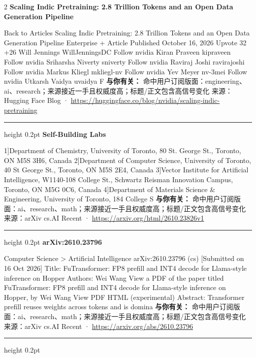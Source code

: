 \documentclass[10.5pt]{ctexart}
\begin{document}
\begin{multicols}{2}
{\large\bfseries Scaling Indic Pretraining: 2.8 Trillion Tokens and an Open Data Generation Pipeline}\par
Back to Articles Scaling Indic Pretraining: 2.8 Trillion Tokens and an Open Data Generation Pipeline Enterprise + Article Published October 16, 2026 Upvote 32 +26 Will Jennings WillJenningsDC Follow nvidia Kiran Praveen kipraveen Follow nvidia Sriharsha Niverty sniverty Follow nvidia Raviraj Joshi ravirajoshi Follow nvidia Markus Kliegl mkliegl-nv Follow nvidia Yev Meyer nv-3mei Follow nvidia Utkarsh Vaidya uvaidya F
\textbf{与你有关：} 命中用户订阅版面：engineering、ai、research；来源接近一手且权威度高；标题/正文包含高信号变化
{\footnotesize\color{ormuted} 来源：Hugging Face Blog · \url{https://huggingface.co/blog/nvidia/scaling-indic-pretraining}}
\vspace{2mm}
\hrule height 0.2pt
\vspace{2mm}
{\large\bfseries Self-Building Labs}\par
1]Department of Chemistry, University of Toronto, 80 St. George St., Toronto, ON M5S 3H6, Canada 2]Department of Computer Science, University of Toronto, 40 St George St., Toronto, ON M5S 2E4, Canada 3]Vector Institute for Artificial Intelligence, W1140-108 College St., Schwartz Reisman Innovation Campus, Toronto, ON M5G 0C6, Canada 4]Department of Materials Science \& Engineering, University of Toronto, 184 College S
\textbf{与你有关：} 命中用户订阅版面：ai、research、math；来源接近一手且权威度高；标题/正文包含高信号变化
{\footnotesize\color{ormuted} 来源：arXiv cs.AI Recent · \url{https://arxiv.org/html/2610.23826v1}}
\vspace{2mm}
\hrule height 0.2pt
\vspace{2mm}
{\large\bfseries arXiv:2610.23796}\par
Computer Science > Artificial Intelligence arXiv:2610.23796 (cs) [Submitted on 16 Oct 2026] Title: FuTransformer: FP8 prefill and INT4 decode for Llama-style inference on Hopper Authors: Wei Wang View a PDF of the paper titled FuTransformer: FP8 prefill and INT4 decode for Llama-style inference on Hopper, by Wei Wang View PDF HTML (experimental) Abstract: Transformer prefill reuses weights across tokens and is domina
\textbf{与你有关：} 命中用户订阅版面：ai、research、math；来源接近一手且权威度高；标题/正文包含高信号变化
{\footnotesize\color{ormuted} 来源：arXiv cs.AI Recent · \url{https://arxiv.org/abs/2610.23796}}
\vspace{2mm}
\hrule height 0.2pt

\end{multicols}
\end{document}
